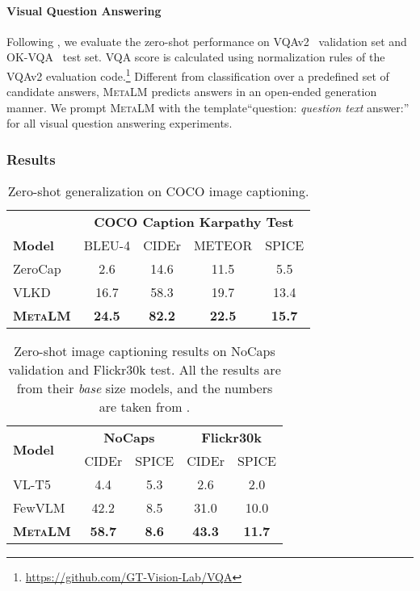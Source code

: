 \documentclass{article}
\theoremstyle{plain}
\theoremstyle{definition}
\theoremstyle{remark}
\newcommand\ours{\textsc{MetaLM}}
\begin{document}
\paragraph{Visual Question Answering}
Following \citep{tsimpoukelli2021frozen}, we evaluate the zero-shot performance on VQAv2~\citep{vqav2} validation set and OK-VQA~\citep{marino2019okvqa} test set.
VQA score is calculated using normalization rules of the VQAv2 evaluation code.\footnote{\url{https://github.com/GT-Vision-Lab/VQA}}
Different from classification over a predefined set of candidate answers, \ours{} predicts answers in an open-ended generation manner.
We prompt \ours{} with the template``question: \textit{question text} answer:'' for all visual question answering experiments.


\subsubsection{Results}


\begin{table}[t]
\centering
\begin{tabular}{@{}lcccc@{}}
\toprule
 & \multicolumn{4}{c}{\textbf{COCO Caption Karpathy Test}} \\ \cmidrule(l){2-5} 
\multirow{-2}{*}{\textbf{Model}} & BLEU-4 & CIDEr & METEOR & SPICE \\ \midrule
{ZeroCap~\citep{tewel2021zero}} & {2.6} & {14.6} & { 11.5} & {5.5} \\
{VLKD~\citep{dai2021enabling}} & {16.7} & {58.3} & {19.7} & {13.4} \\
\textbf{\ours{}} & \textbf{24.5} & \textbf{82.2} & \textbf{22.5} & \textbf{15.7} \\
\bottomrule
\end{tabular}
\caption{Zero-shot generalization on COCO image captioning.
}
\label{tab:zs-caption:coco}
\end{table}

\begin{table}[t]
\centering
\begin{tabular}{@{}lcccc@{}}
\toprule
\multirow{2}{*}{\textbf{Model}} & \multicolumn{2}{c|}{\textbf{NoCaps}} & \multicolumn{2}{c}{\textbf{Flickr30k}} \\ \cmidrule(l){2-5} 
 & CIDEr & SPICE & CIDEr & SPICE \\ \midrule
VL-T5~\citep{cho2021unifying} & 4.4 & 5.3 & 2.6 & 2.0 \\
FewVLM~\citep{jin2022fewVLM} & 42.2 & 8.5 & 31.0 & 10.0 \\
\textbf{\ours{}} & \textbf{58.7} & \textbf{8.6} & \textbf{43.3}  & \textbf{11.7} \\ \bottomrule
\end{tabular}
\caption{Zero-shot image captioning results on NoCaps validation and Flickr30k test. All the results are from their \textit{base} size models, and the numbers are taken from \citep{jin2022fewVLM}.
}
\label{tab:zs-caption}
\end{table}
\end{document}
